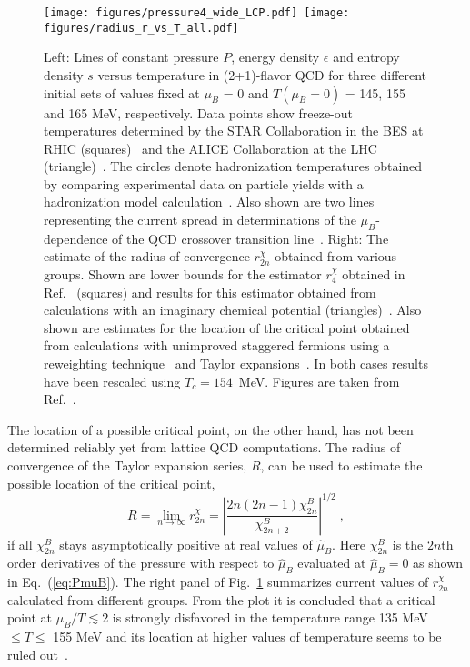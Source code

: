 \documentclass{PoS}
\newcommand{\be}{\begin{equation}}
\newcommand{\ee}{\end{equation}}
\begin{document}
\begin{figure}
\begin{center}
\texttt{[image: figures/pressure4\_wide\_LCP.pdf]}~\texttt{[image: figures/radius\_r\_vs\_T\_all.pdf]}
\end{center}
\caption{ Left: Lines of constant pressure $P$, energy density $\epsilon$ and entropy density $s$ versus temperature in (2+1)-flavor QCD for three different initial sets of values fixed at $\mu_B$ = 0 and $T(\mu_B=0)$ = 145, 155 and 165 MeV, respectively. Data points show freeze-out temperatures determined by the STAR Collaboration in the BES at RHIC (squares)~\cite{Das:2014qca} and the ALICE Collaboration at the LHC (triangle)~\cite{Floris:2014pta}. The circles denote hadronization temperatures obtained by comparing experimental data on particle yields with a hadronization model calculation~\cite{Becattini:2016xct}. Also shown are two lines representing the current spread in determinations of the $\mu_B$-dependence of the QCD crossover transition line~\cite{Kaczmarek:2011zz,Endrodi:2011gv,Bonati:2014rfa,Cea:2015cya,Bellwied:2015rza}. Right:
The estimate of the radius of convergence $r_{2n}^{\chi}$ obtained from various groups.  Shown are lower
bounds for the estimator $r_4^{\chi}$ obtained in Ref.~\cite{Bazavov:2017dus} (squares)
and results for this estimator obtained from calculations with an
imaginary chemical potential (triangles)~\cite{DElia:2016jqh}.
Also shown are estimates for the location of the critical point
obtained from calculations with unimproved staggered fermions using
a reweighting technique~\cite{Fodor:2004nz} and Taylor expansions~\cite{Datta:2016ukp}.
In both cases results have been rescaled using $T_c=154$~MeV. Figures are taken from Ref.~\cite{Bazavov:2017dus}.}
\label{fig:PhaseMuB}
\end{figure}



The location of a possible critical point, on the other hand, has not been determined reliably yet from lattice QCD computations. The radius of convergence of the Taylor expansion series, $R$, can be used to estimate the possible location of
the critical point,
\be
R=\lim_{n\rightarrow\infty}r_{2n}^{\chi} = \left| \frac{2n (2n-1)\chi_{2n}^B}{\chi_{2n+2}^B} \right|^{1/2} \; ,
\ee
if all $\chi_{2n}^B$ stays asymptotically positive at real values of $\hat{\mu}_B$.
Here $\chi_{2n}^B$ is the $2n$th order derivatives of the pressure with respect to $\hat{\mu}_B$ evaluated at $\hat{\mu}_B=0$ as shown in Eq.~(\ref{eq:PmuB}).
The right panel of Fig.~\ref{fig:PhaseMuB} summarizes current values of $r_{2n}^{\chi}$ calculated from different groups.
From the plot it is concluded that a critical point at $\mu_B/T\lesssim$2 is strongly disfavored in the temperature range 135 MeV $\leq T\leq$ 155 MeV and its location at higher values of temperature seems to be ruled out~\cite{Bazavov:2017dus}.
\end{document}
